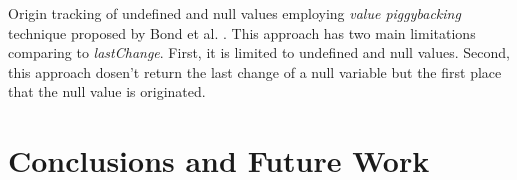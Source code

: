 \documentclass[preprint]{sigplanconf}
\begin{document}
Origin tracking of undefined and null values employing \textit{value piggybacking} technique proposed by
Bond et al. \cite{Bond}. This approach has two main limitations comparing to \textit{lastChange}.
First, it is limited to undefined and null values. Second, this approach dosen't return the last change
of a null variable but the first place that the null value is originated.

 


\section{Conclusions and Future Work}






\end{document}
